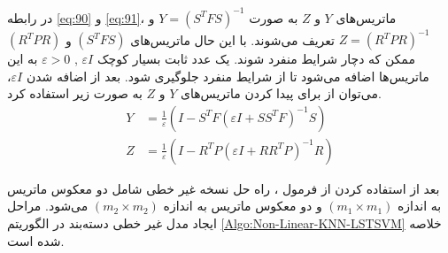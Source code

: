 در رابطه \ref{eq:90} و \ref{eq:91}، ماتریس‌های $Y$ و $Z$  به صورت  $Y={{({{S}^{T}}FS)}^{-1}}$ و  $Z={{({{R}^{T}}PR)}^{-1}}$ تعریف می‌شوند. با این حال ماتریس‌های $({{S}^{T}}FS)$ و $({{R}^{T}}PR)$  ممکن که دچار شرایط منفرد شوند. یک عدد ثابت بسیار کوچک  $\varepsilon I$ , $\varepsilon > 0$ به این ماتریس‌ها اضافه می‌شود تا از شرایط منفرد جلوگیری شود. بعد از اضافه شدن $\varepsilon I$، می‌توان از  برای پیدا کردن ماتریس‌های $Y$ و $Z$ به صورت زیر استفاده کرد.
\begin{align}
Y&= \frac{1}{\varepsilon }(I-{{S}^{T}}F{{(\varepsilon I+S{{S}^{T}}F)}^{-1}}S) \label{eq:92} \\
Z&= \frac{1}{\varepsilon }(I-{{R}^{T}}P{{(\varepsilon I+R{{R}^{T}}P)}^{-1}}R) \label{eq:93}
\end{align}

بعد از استفاده کردن از فرمول ، راه حل نسخه غیر خطی شامل دو معکوس ماتریس به اندازه  $(m_1 \times m_1)$ و دو معکوس ماتریس به اندازه $(m_2 \times m_2)$  می‌شود. مراحل ایجاد مدل غیر خطی دسته‌بند  در الگوریتم \ref{Algo:Non-Linear-KNN-LSTSVM} خلاصه شده است.

